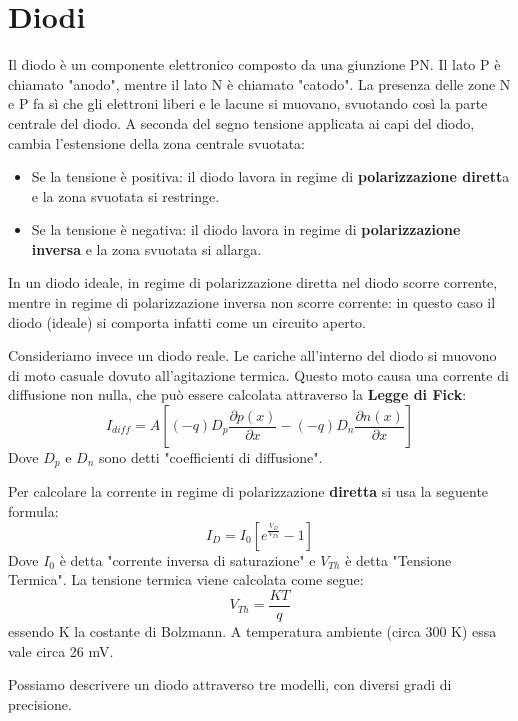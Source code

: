 \documentclass[\main/main.tex]{subfiles}
\begin{document}
\section{Diodi}
Il diodo è un componente elettronico composto da una giunzione PN. 
Il lato P è chiamato "anodo", mentre il lato N è chiamato "catodo". 
La presenza delle zone N e P fa sì che gli elettroni liberi e le lacune si muovano, svuotando così la parte centrale del diodo. 
A seconda del segno tensione applicata ai capi del diodo, cambia l'estensione della zona centrale svuotata: 
\begin{itemize} 
    \item Se la tensione è positiva: il diodo lavora in regime di \textbf{polarizzazione dirett}a e la zona svuotata si restringe.  
	\item Se la tensione è negativa: il diodo lavora in regime di \textbf{polarizzazione inversa} e la zona svuotata si allarga.  
\end{itemize}
In un diodo ideale, in regime di polarizzazione diretta nel diodo scorre corrente, mentre in regime di polarizzazione inversa non scorre corrente: in questo caso il diodo (ideale) si comporta infatti come un circuito aperto. 

Consideriamo invece un diodo reale. 
Le cariche all'interno del diodo si muovono di moto casuale dovuto all'agitazione termica. Questo moto causa una corrente di diffusione non nulla, che può essere calcolata attraverso la \textbf{Legge di Fick}:
\[I_{diff} = A \left[(-q)D_p\frac{\partial p(x)}{\partial x} - (-q)D_n\frac{\partial n(x)}{\partial x} \right]\]
Dove  $D_{p}$ e  $D_{n} $ sono detti "coefficienti di diffusione".

Per calcolare la corrente in regime di polarizzazione \textbf{diretta} si usa la seguente formula:
\[I_D = I_0 \left[e^{\frac{V_D}{V_{Th}}}-1 \right]\]
Dove  $I_0$ è detta "corrente inversa di saturazione" e  $V_{Th} $ è detta "Tensione Termica".
La tensione termica viene calcolata come segue:
\[V_{Th} = \frac{KT}{q}\]
essendo K la costante di Bolzmann. A temperatura ambiente (circa 300 K) essa vale circa 26 mV.

Possiamo descrivere un diodo attraverso tre modelli, con diversi gradi di precisione.
\end{document}
